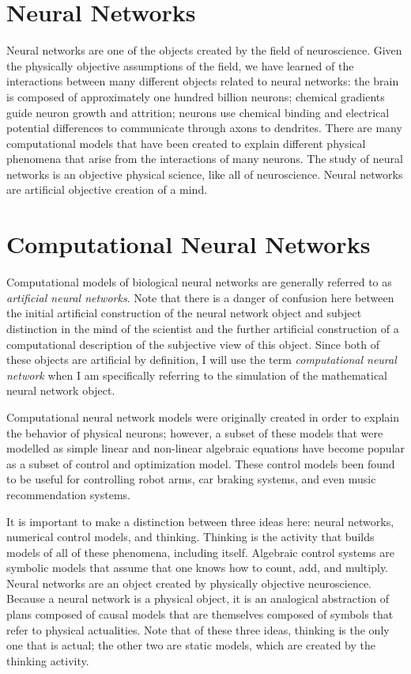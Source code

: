 \section{Neural Networks}

Neural networks are one of the objects created by the field of
neuroscience.  Given the physically objective assumptions of the
field, we have learned of the interactions between many different
objects related to neural networks: the brain is composed of
approximately one hundred billion neurons; chemical gradients guide
neuron growth and attrition; neurons use chemical binding and
electrical potential differences to communicate through axons to
dendrites.  There are many computational models that have been created
to explain different physical phenomena that arise from the
interactions of many neurons.  The study of neural networks is an
objective physical science, like all of neuroscience.  Neural networks
are artificial objective creation of a mind.

\section{Computational Neural Networks}

Computational models of biological neural networks are generally
referred to as \emph{artificial neural networks}.  Note that there is
a danger of confusion here between the initial artificial construction
of the neural network object and subject distinction in the mind of
the scientist and the further artificial construction of a
computational description of the subjective view of this object.
Since both of these objects are artificial by definition, I will use
the term \emph{computational neural network} when I am specifically
referring to the simulation of the mathematical neural network object.

Computational neural network models were originally created in order
to explain the behavior of physical neurons; however, a subset of
these models that were modelled as simple linear and non-linear
algebraic equations have become popular as a subset of control and
optimization model.  These control models been found to be useful for
controlling robot arms, car braking systems, and even music
recommendation systems.

It is important to make a distinction between three ideas here: neural
networks, numerical control models, and thinking.  Thinking is the
activity that builds models of all of these phenomena, including
itself.  Algebraic control systems are symbolic models that assume
that one knows how to count, add, and multiply.  Neural networks are
an object created by physically objective neuroscience.  Because a
neural network is a physical object, it is an analogical abstraction
of plans composed of causal models that are themselves composed of
symbols that refer to physical actualities.  Note that of these three
ideas, thinking is the only one that is actual; the other two are
static models, which are created by the thinking activity.

